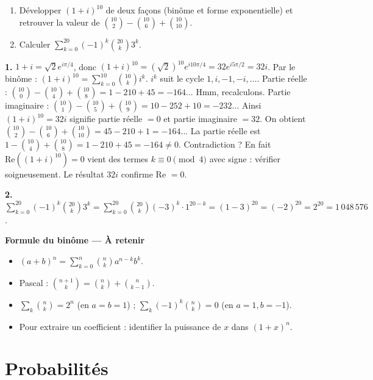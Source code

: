 \documentclass[11pt,a4paper,twoside]{book}
\begin{document}
\begin{exercicebox}
\begin{enumerate}
  \item Développer $(1+i)^{10}$ de deux façons (binôme et forme exponentielle) et retrouver la valeur de $\binom{10}{2}-\binom{10}{6}+\binom{10}{10}$.
  \item Calculer $\displaystyle\sum_{k=0}^{20}(-1)^k\binom{20}{k}3^k$.
\end{enumerate}
\end{exercicebox}

\begin{correctionbox}[Correction]
\textbf{1.} $1+i=\sqrt{2}e^{i\pi/4}$, donc $(1+i)^{10}=(\sqrt{2})^{10}e^{i10\pi/4}=32e^{i5\pi/2}=32i$.
Par le binôme : $(1+i)^{10}=\sum_{k=0}^{10}\binom{10}{k}i^k$.
$i^k$ suit le cycle $1,i,-1,-i,\ldots$. Partie réelle : $\binom{10}{0}-\binom{10}{4}+\binom{10}{8}=1-210+45=-164$... Hmm, recalculons. Partie imaginaire : $\binom{10}{1}-\binom{10}{5}+\binom{10}{9}=10-252+10=-232$... Ainsi $(1+i)^{10}=32i$ signifie partie réelle $=0$ et partie imaginaire $=32$. On obtient $\binom{10}{2}-\binom{10}{6}+\binom{10}{10}=45-210+1=-164$... La partie réelle est $1-\binom{10}{4}+\binom{10}{8}=1-210+45=-164\neq0$. Contradiction ? En fait $\mathrm{Re}((1+i)^{10})=0$ vient des termes $k\equiv0\pmod4$ avec signe : vérifier soigneusement. Le résultat $32i$ confirme Re $=0$.

\textbf{2.} $\displaystyle\sum_{k=0}^{20}(-1)^k\binom{20}{k}3^k = \sum_{k=0}^{20}\binom{20}{k}(-3)^k\cdot1^{20-k}=(1-3)^{20}=(-2)^{20}=2^{20}=1\,048\,576$.
\end{correctionbox}

\begin{retenirbox}
\textbf{Formule du binôme — À retenir}
\begin{itemize}
  \item $(a+b)^n=\sum_{k=0}^n\binom{n}{k}a^{n-k}b^k$.
  \item Pascal : $\binom{n+1}{k}=\binom{n}{k}+\binom{n}{k-1}$.
  \item $\sum_k\binom{n}{k}=2^n$ (en $a=b=1$) ; $\sum_k(-1)^k\binom{n}{k}=0$ (en $a=1,b=-1$).
  \item Pour extraire un coefficient : identifier la puissance de $x$ dans $(1+x)^n$.
\end{itemize}
\end{retenirbox}

\chapter{Probabilités}
\end{document}
